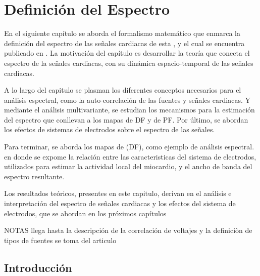 \chapter{Definición  del Espectro}

\begin{resumen}

En el siguiente capítulo se aborda el formalismo matemático que enmarca la
definición del espectro de las señales cardiacas de esta \nombreDoc, y el cual
se encuentra publicado en \cite{Requena13b}. La motivación del capítulo es
desarrollar la teoría que conecta el espectro de la señales cardiacas, con su
dinámica espacio-temporal de las señales cardiacas.

A lo largo del capitulo se plasman los diferentes conceptos necesarios para el
análisis espectral, como la auto-correlación de las fuentes y  señales
cardiacas. Y mediante el análisis multivariante, se estudian los mecanismos para
la estimación del espectro que conllevan a los mapas de \acf{DF} y de \acf{PF}.
Por último, se abordan los efectos de sistemas de electrodos sobre el espectro
de las señales.


Para terminar, se aborda los mapas de (\ac{DF}), como ejemplo de análisis
espectral. en donde se expome la relación entre las caracteristicas del sistema
de electrodos, utilizados para estimar la actividad local del miocardio, y el
ancho de banda del espectro resultante.

Los resultados teóricos, presentes en este capitulo, derivan en el análisis e
interpretación del espectro de señales cardiacas y los efectos del sistema
de electrodos, que se abordan en los próximos capítulos

NOTAS llega hasta la descripción de la correlación de voltajes  y la definiciòn de tipos de fuentes se toma del articulo


\end{resumen}


\section{Introducción}

